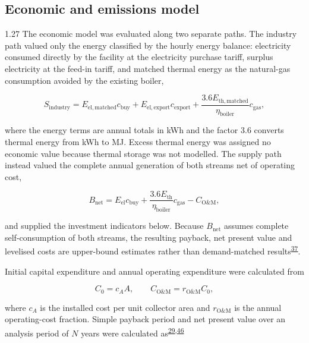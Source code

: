 \documentclass[12pt,letterpaper]{article}
\newcommand{\done}{\ \textcolor{green!45!black}{$\checkmark$}} %
\DeclareRobustCommand{\citenum}[1]{\hyperlink{ref:#1}{#1}} %
\begin{document}
\subsection[Economic and emissions model\done]{Economic and emissions model}\label{sec31}

\begin{spacing}{1.27}
The economic model was evaluated along two separate paths. The industry path valued only the energy classified by the hourly energy balance: electricity consumed directly by the facility at the electricity purchase tariff, surplus electricity at the feed-in tariff, and matched thermal energy as the natural-gas consumption avoided by the existing boiler,

\begin{equation}
S_{\mathrm{industry}} = E_{\mathrm{el,matched}}c_{\mathrm{buy}} + E_{\mathrm{el,export}}c_{\mathrm{export}} + \frac{3.6E_{\mathrm{th,matched}}}{\eta_{\mathrm{boiler}}}c_{\mathrm{gas}},
\label{eq:sindustry}
\end{equation}

\noindent where the energy terms are annual totals in kWh and the factor 3.6 converts thermal energy from kWh to MJ. Excess thermal energy was assigned no economic value because thermal storage was not modelled. The supply path instead valued the complete annual generation of both streams net of operating cost,

\begin{equation}
B_{\mathrm{net}} = E_{\mathrm{el}}c_{\mathrm{buy}} + \frac{3.6E_{\mathrm{th}}}{\eta_{\mathrm{boiler}}}c_{\mathrm{gas}} - C_{\mathrm{O\&M}},
\label{eq:bnet}
\end{equation}

\noindent and supplied the investment indicators below. Because $B_{\mathrm{net}}$ assumes complete self-consumption of both streams, the resulting payback, net present value and levelised costs are upper-bound estimates rather than demand-matched results\textsuperscript{\citenum{37}}.\par

\vspace{0.15in}

Initial capital expenditure and annual operating expenditure were calculated from

\begin{equation}
C_0 = c_A A, \qquad C_{\mathrm{O\&M}} = r_{\mathrm{O\&M}}C_0,
\label{eq:capex}
\end{equation}

\noindent where $c_A$ is the installed cost per unit collector area and $r_{\mathrm{O\&M}}$ is the annual operating-cost fraction. Simple payback period and net present value over an analysis period of $N$ years were calculated as\textsuperscript{\citenum{29},\citenum{46}}


\end{spacing}
\end{document}
